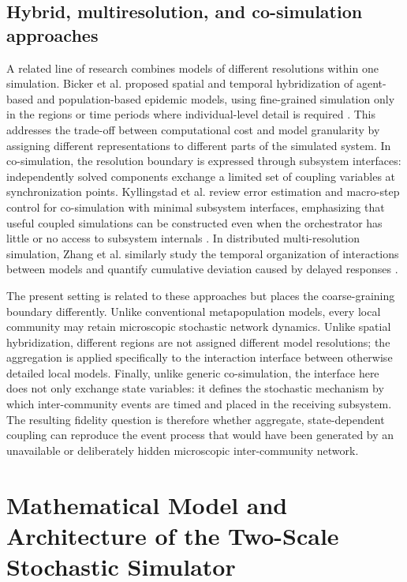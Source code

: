 \documentclass[a4paper,fleqn]{cas-sc}
\begin{document}
\subsection{Hybrid, multiresolution, and co-simulation approaches}

A related line of research combines models of different resolutions within one simulation. Bicker et al. proposed spatial and temporal hybridization of agent-based and population-based epidemic models, using fine-grained simulation only in the regions or time periods where individual-level detail is required \cite{bicker2025}. This addresses the trade-off between computational cost and model granularity by assigning different representations to different parts of the simulated system. In co-simulation, the resolution boundary is expressed through subsystem interfaces: independently solved components exchange a limited set of coupling variables at synchronization points. Kyllingstad et al. review error estimation and macro-step control for co-simulation with minimal subsystem interfaces, emphasizing that useful coupled simulations can be constructed even when the orchestrator has little or no access to subsystem internals \cite{kyllingstad2025}. In distributed multi-resolution simulation, Zhang et al. similarly study the temporal organization of interactions between models and quantify cumulative deviation caused by delayed responses \cite{zhang2024multiresolution}.

The present setting is related to these approaches but places the coarse-graining boundary differently. Unlike conventional metapopulation models, every local community may retain microscopic stochastic network dynamics. Unlike spatial hybridization, different regions are not assigned different model resolutions; the aggregation is applied specifically to the interaction interface between otherwise detailed local models. Finally, unlike generic co-simulation, the interface here does not only exchange state variables: it defines the stochastic mechanism by which inter-community events are timed and placed in the receiving subsystem. The resulting fidelity question is therefore whether aggregate, state-dependent coupling can reproduce the event process that would have been generated by an unavailable or deliberately hidden microscopic inter-community network.

\section{Mathematical Model and Architecture of the Two-Scale Stochastic Simulator}
\label{sec:model_architecture}
\end{document}
